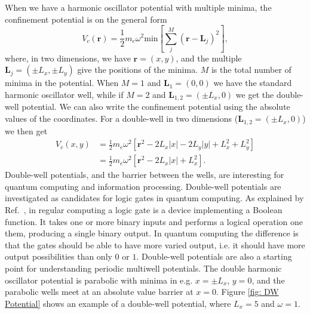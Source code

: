 \documentclass[../main.tex]{subfiles}
\begin{document}
When we have a harmonic oscillator potential with multiple minima, the confinement potential is on the general form\cite{master project}
\begin{equation}
    V_c(\mathbf{r}) = \frac{1}{2} m_e \omega^2 \textrm{min}\left[\sum_j^M (\mathbf{r}-\mathbf{L}_j)^2\right],
\end{equation}
where, in two dimensions, we have $\mathbf{r} = (x,y)$, and the multiple $\mathbf{L}_j = (\pm L_x, \pm L_y)$ give the positions of the minima. $M$ is the total number of minima in the potential. When $M=1$ and $\mathbf{L}_1 = (0,0)$ we have the standard harmonic oscillator well, while if $M=2$ and $\mathbf{L}_{1,2} = (\pm L_x, 0)$ we get the double-well potential. We can also write the confinement potential using the absolute values of the coordinates. For a double-well in two dimensions ($\mathbf{L}_{1,2} = (\pm L_x, 0)$) we then get
\begin{equation}\label{eq: DW Potential}
\begin{split}
    V_c(x,y) &= \frac{1}{2} m_e \omega^2[\mathbf{r}^2 - 2L_x|x| - 2L_y|y| + L_x^2 + L_y^2]\\
    &= \frac{1}{2} m_e \omega^2[\mathbf{r}^2 - 2L_x|x| + L_x^2].
\end{split}
\end{equation}
Double-well potentials, and the barrier between the wells, are interesting for quantum computing and information processing. Double-well potentials are investigated as candidates for logic gates in quantum computing\cite{Multiwells}. As explained by Ref.~\cite{Logic Gate}, in regular computing a logic gate is a device implementing a Boolean function. It takes one or more binary inputs and performs a logical operation one them, producing a single binary output. In quantum computing the difference is that the gates should be able to have more varied output, i.e. it should have more output possibilities than only $0$ or $1$. Double-well potentials are also a starting point for understanding periodic multiwell potentials. The double harmonic oscillator potential is parabolic with minima in e.g. $x = \pm L_x$, $y = 0$, and the parabolic wells meet at an absolute value barrier at $x=0$. Figure \ref{fig: DW Potential} shows an example of a double-well potential, where $L_x = 5$ and $\omega = 1$.
\end{document}
